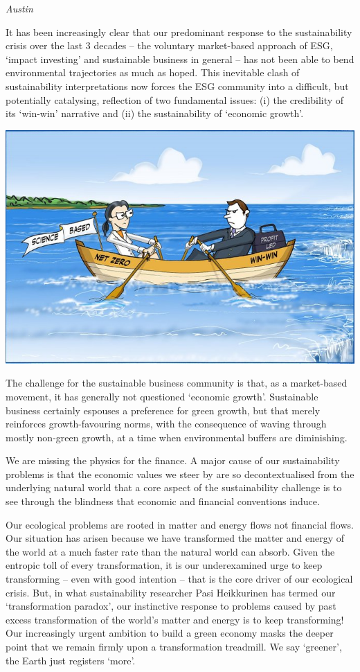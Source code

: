 \documentclass[
]{book}
\begin{document}
\emph{Austin}

It has been increasingly clear that our predominant response to the sustainability crisis over the last 3 decades -- the voluntary market-based approach of ESG, `impact investing' and sustainable business in general -- has not been able to bend environmental trajectories as much as hoped. This inevitable clash of sustainability interpretations now forces the ESG community into a difficult, but potentially catalysing, reflection of two fundamental issues: (i) the credibility of its `win-win' narrative and (ii) the sustainability of `economic growth'.

\includegraphics{fig/win-win_vs_net-zero.jpeg}

The challenge for the sustainable business community is that, as a market-based movement, it has generally not questioned `economic growth'. Sustainable business certainly espouses a preference for green growth, but that merely reinforces growth-favouring norms, with the consequence of waving through mostly non-green growth, at a time when environmental buffers are diminishing.

We are missing the physics for the finance. A major cause of our sustainability problems is that the economic values we steer by are so decontextualised from the underlying natural world that a core aspect of the sustainability challenge is to see through the blindness that economic and financial conventions induce.

Our ecological problems are rooted in matter and energy flows not financial flows. Our situation has arisen because we have transformed the matter and energy of the world at a much faster rate than the natural world can absorb. Given the entropic toll of every transformation, it is our underexamined urge to keep transforming -- even with good intention -- that is the core driver of our ecological crisis. But, in what sustainability researcher Pasi Heikkurinen has termed our `transformation paradox', our instinctive response to problems caused by past excess transformation of the world's matter and energy is to keep transforming! Our increasingly urgent ambition to build a green economy masks the deeper point that we remain firmly upon a transformation treadmill. We say `greener', the Earth just registers `more'.
\end{document}
